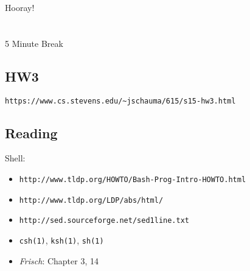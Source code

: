 \documentclass[xga]{xdvislides}
\begin{document}
\newpage
\vspace*{\fill}
\begin{center}
    \Hugesize
        Hooray! \\ [1em]
    \hspace*{5mm}
    \blueline\\
    \hspace*{5mm}\\
        5 Minute Break
\end{center}
\vspace*{\fill}

\subsection{HW3}
\vspace*{\fill}
\begin{center}
\begin{verbatim}
https://www.cs.stevens.edu/~jschauma/615/s15-hw3.html
\end{verbatim}
\end{center}
\vspace*{\fill}


\subsection{Reading}
Shell:
\begin{itemize}
	\item \verb+http://www.tldp.org/HOWTO/Bash-Prog-Intro-HOWTO.html+
	\item \verb+http://www.tldp.org/LDP/abs/html/+
	\item \verb+http://sed.sourceforge.net/sed1line.txt+
	\item \verb+csh(1)+, \verb+ksh(1)+, \verb+sh(1)+
	\item {\em Frisch}: Chapter 3, 14
\end{itemize}
\end{document}
